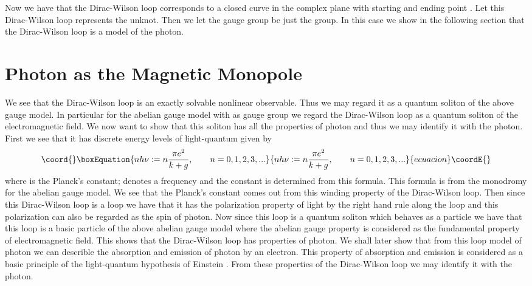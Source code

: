 \documentclass[a4paper,a4paper]{article}
\begin{document}
Now
we have that the Dirac-Wilson loop \coordHE{} corresponds to a closed
curve in the complex plane with starting and ending
point \coordHE{}. 
Let this Dirac-Wilson loop \coordHE{} represents the unknot. Then we let the gauge group be just the \coordHE{} group. In this case we show in the following section that the Dirac-Wilson loop \coordHE{} is a model of the photon.


\section{Photon as the Magnetic Monopole}

We see that the Dirac-Wilson loop is an exactly solvable nonlinear observable. Thus we may regard it as a quantum soliton of the above gauge model. In particular for the abelian gauge model with \coordHE{} as gauge group we regard the Dirac-Wilson loop as a quantum soliton of the electromagnetic field. We now want to show that this soliton has all the properties of photon and thus we may identify it with the photon. First we see that it has discrete energy levels of light-quantum given by
\begin{equation}\coord{}\boxEquation{ 
n h \nu :=n \frac{\pi e^2}{k+g}, \qquad n=0,1,2,3, . . .
\label{planck}
}{ 
n h \nu :=n \frac{\pi e^2}{k+g}, \qquad n=0,1,2,3, . . .
}{ecuacion}\coordE{}\end{equation}
 where \coordHE{} is the Planck's constant; \myHighlight{$\nu$}\coordHE{} denotes a frequency and the constant \coordHE{} is determined from this formula. This formula is from the monodromy \coordHE{} for the abelian gauge model. We see that the Planck's constant \coordHE{} comes out from this winding property of the Dirac-Wilson loop. Then since this Dirac-Wilson loop is a loop we have that it has the polarization property of light by the right hand rule along the loop and this polarization can also be regarded as the spin of photon. Now since this loop is a quantum soliton which behaves as a particle we have that this loop is a basic particle of the above abelian gauge model where the abelian gauge property is considered as the fundamental property of electromagnetic field. This shows that the Dirac-Wilson loop has properties of photon. We shall later show that from this loop model of photon we can describle the absorption and emission of photon by an electron. This property of absorption and emission is considered as a basic principle of the light-quantum hypothesis of Einstein \cite{Pai}. From these properties of the Dirac-Wilson loop we may identify it with the photon.
\end{document}
